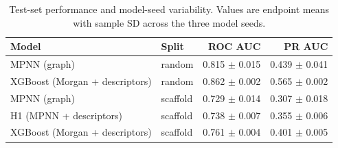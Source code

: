 \begin{table}[t]
\centering
\caption{Test-set performance and model-seed variability. Values are endpoint means with sample SD across the three model seeds.}
\label{tab:member5-seed-variance}
\begin{tabular}{llrr}
\hline
Model & Split & ROC AUC & PR AUC \\
\hline
MPNN (graph) & random & 0.815 $\pm$ 0.015 & 0.439 $\pm$ 0.041 \\
XGBoost (Morgan + descriptors) & random & 0.862 $\pm$ 0.002 & 0.565 $\pm$ 0.002 \\
MPNN (graph) & scaffold & 0.729 $\pm$ 0.014 & 0.307 $\pm$ 0.018 \\
H1 (MPNN + descriptors) & scaffold & 0.738 $\pm$ 0.007 & 0.355 $\pm$ 0.006 \\
XGBoost (Morgan + descriptors) & scaffold & 0.761 $\pm$ 0.004 & 0.401 $\pm$ 0.005 \\
\hline
\end{tabular}
\end{table}
